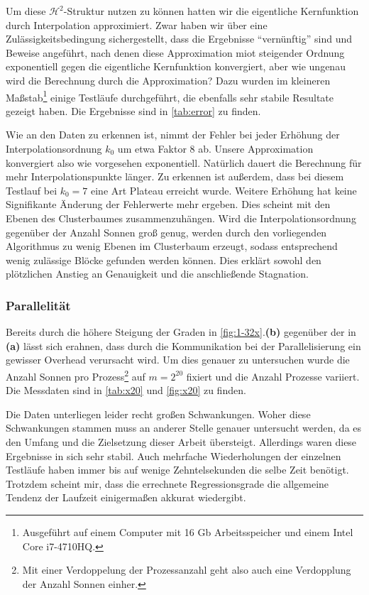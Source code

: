   Um diese $\mathcal{H}^2$-Struktur nutzen zu können hatten wir die eigentliche Kernfunktion durch Interpolation approximiert. Zwar haben wir über eine Zulässigkeitsbedingung sichergestellt, dass die 
  Ergebnisse ``vernünftig'' sind und Beweise angeführt, nach denen diese Approximation miot steigender Ordnung exponentiell gegen die eigentliche Kernfunktion konvergiert, aber wie ungenau wird die
  Berechnung durch die Approximation? Dazu wurden im kleineren Maßstab\footnote{Ausgeführt auf einem Computer mit 16 Gb Arbeitsspeicher und einem Intel Core i7-4710HQ.} einige Testläufe durchgeführt, 
  die ebenfalls sehr stabile Resultate gezeigt haben. Die Ergebnisse sind in \autoref{tab:error} zu finden.
  
  Wie an den Daten zu erkennen ist, nimmt der Fehler bei jeder Erhöhung der Interpolationsordnung $k_0$ um etwa Faktor $8$ ab. Unsere Approximation konvergiert also wie vorgesehen exponentiell. Natürlich
  dauert die Berechnung für mehr Interpolationspunkte länger. Zu erkennen ist außerdem, dass bei diesem Testlauf bei $k_0=7$ eine Art Plateau erreicht wurde. Weitere Erhöhung hat keine Signifikante
  Änderung der Fehlerwerte mehr ergeben. Dies scheint mit den Ebenen des Clusterbaumes zusammenzuhängen. Wird die Interpolationsordnung gegenüber der Anzahl Sonnen groß genug, werden durch den
  vorliegenden Algorithmus zu wenig Ebenen im Clusterbaum erzeugt, sodass entsprechend wenig zulässige Blöcke gefunden werden können. Dies erklärt sowohl den plötzlichen Anstieg an Genauigkeit und
  die anschließende Stagnation.
  
  \subsubsection{Parallelität}
  
  Bereits durch die höhere Steigung der Graden in \autoref{fig:1-32x}.\textbf{(b)} gegenüber der in \textbf{(a)} lässt sich erahnen, dass durch die Kommunikation bei der Parallelisierung ein gewisser
  Overhead verursacht wird. Um dies genauer zu untersuchen wurde die Anzahl Sonnen pro Prozess\footnote{Mit einer Verdoppelung der Prozessanzahl geht also auch eine Verdopplung der Anzahl Sonnen 
  einher.} auf $m = 2^{20}$ fixiert und die Anzahl Prozesse variiert.  Die Messdaten sind in \autoref{tab:x20} und \autoref{fig:x20} zu finden. 
  
  Die Daten unterliegen leider recht großen Schwankungen. Woher diese Schwankungen stammen muss an anderer Stelle genauer untersucht werden, da es den Umfang und die Zielsetzung dieser Arbeit 
  übersteigt. Allerdings waren diese Ergebnisse in sich sehr stabil. Auch mehrfache Wiederholungen der einzelnen Testläufe haben immer bis auf wenige Zehntelsekunden die selbe Zeit benötigt. 
   Trotzdem scheint mir, dass die errechnete Regressionsgrade die allgemeine Tendenz der Laufzeit einigermaßen akkurat wiedergibt.
  
